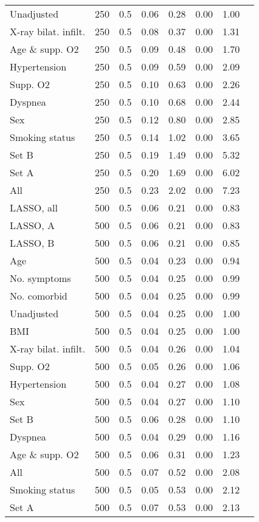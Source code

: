 \documentclass{article}
\begin{document}
{\begin{longtable}{lccccccc}
Unadjusted & 250 & 0.5 & 0.06 & 0.28 & 0.00 & 1.00\\
X-ray bilat. infilt. & 250 & 0.5 & 0.08 & 0.37 & 0.00 & 1.31\\
Age \& supp. O2 & 250 & 0.5 & 0.09 & 0.48 & 0.00 & 1.70\\
Hypertension & 250 & 0.5 & 0.09 & 0.59 & 0.00 & 2.09\\
Supp. O2 & 250 & 0.5 & 0.10 & 0.63 & 0.00 & 2.26\\
Dyspnea & 250 & 0.5 & 0.10 & 0.68 & 0.00 & 2.44\\
Sex & 250 & 0.5 & 0.12 & 0.80 & 0.00 & 2.85\\
Smoking status & 250 & 0.5 & 0.14 & 1.02 & 0.00 & 3.65\\
Set B & 250 & 0.5 & 0.19 & 1.49 & 0.00 & 5.32\\
Set A & 250 & 0.5 & 0.20 & 1.69 & 0.00 & 6.02\\
All & 250 & 0.5 & 0.23 & 2.02 & 0.00 & 7.23\\ \midrule
LASSO, all & 500 & 0.5 & 0.06 & 0.21 & 0.00 & 0.83\\
LASSO, A & 500 & 0.5 & 0.06 & 0.21 & 0.00 & 0.83\\
LASSO, B & 500 & 0.5 & 0.06 & 0.21 & 0.00 & 0.85\\
Age & 500 & 0.5 & 0.04 & 0.23 & 0.00 & 0.94\\
No. symptoms & 500 & 0.5 & 0.04 & 0.25 & 0.00 & 0.99\\
No. comorbid & 500 & 0.5 & 0.04 & 0.25 & 0.00 & 0.99\\
Unadjusted & 500 & 0.5 & 0.04 & 0.25 & 0.00 & 1.00\\
BMI & 500 & 0.5 & 0.04 & 0.25 & 0.00 & 1.00\\
X-ray bilat. infilt. & 500 & 0.5 & 0.04 & 0.26 & 0.00 & 1.04\\
Supp. O2 & 500 & 0.5 & 0.05 & 0.26 & 0.00 & 1.06\\
Hypertension & 500 & 0.5 & 0.04 & 0.27 & 0.00 & 1.08\\
Sex & 500 & 0.5 & 0.04 & 0.27 & 0.00 & 1.10\\
Set B & 500 & 0.5 & 0.06 & 0.28 & 0.00 & 1.10\\
Dyspnea & 500 & 0.5 & 0.04 & 0.29 & 0.00 & 1.16\\
Age \& supp. O2 & 500 & 0.5 & 0.06 & 0.31 & 0.00 & 1.23\\
All & 500 & 0.5 & 0.07 & 0.52 & 0.00 & 2.08\\
Smoking status & 500 & 0.5 & 0.05 & 0.53 & 0.00 & 2.12\\
Set A & 500 & 0.5 & 0.07 & 0.53 & 0.00 & 2.13\\ \midrule

\end{longtable}}
\end{document}
